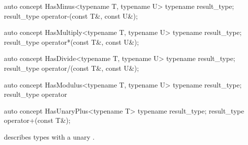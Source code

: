 \documentclass[american,twoside]{book}
\begin{document}
\begin{itemdescr}
\pnum
{}
\end{itemdescr}

\begin{itemdecl}
auto concept HasMinus<typename T, typename U> {
  typename result_type;
  result_type operator-(const T&, const U&);
}
\end{itemdecl}

\begin{itemdescr}
\pnum
{}
\end{itemdescr}

\begin{itemdecl}
auto concept HasMultiply<typename T, typename U> {
  typename result_type;
  result_type operator*(const T&, const U&);
}
\end{itemdecl}

\begin{itemdescr}
\pnum
{}
\end{itemdescr}

\begin{itemdecl}
auto concept HasDivide<typename T, typename U> {
  typename result_type;
  result_type operator/(const T&, const U&);
}
\end{itemdecl}

\begin{itemdescr}
\pnum
{}
\end{itemdescr}

\begin{itemdecl}
auto concept HasModulus<typename T, typename U> {
  typename result_type;
  result_type operator%
}
\end{itemdecl}

\begin{itemdescr}
\pnum
{}
\end{itemdescr}

\begin{itemdecl}
auto concept HasUnaryPlus<typename T> {
  typename result_type;
  result_type operator+(const T&);
}
\end{itemdecl}

\begin{itemdescr}
\pnum
\mbox{\reallynote} describes types with a unary \mbox{}.
\end{itemdescr}
\end{document}
